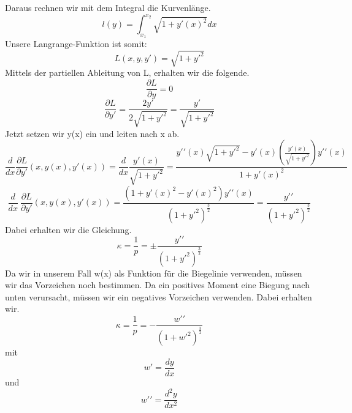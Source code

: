 Daraus rechnen wir mit dem Integral die Kurvenlänge.
\begin{equation}
	l(y)=
	\int_{x_1}^{x_2}\sqrt{1+{y\prime(x)}^2}dx
\end{equation}
Unsere Langrange-Funktion ist somit:
\begin{equation}
	L(x,y,y\prime)=
	\sqrt{1+{y\prime}^2}
\end{equation}
Mittels der partiellen Ableitung von L, erhalten wir die folgende.
\begin{equation}
	\frac{\partial L}{\partial y}=
	0
\end{equation}
\begin{equation}
	\frac{\partial L}{\partial y\prime}=
	\frac{2y\prime}{2\sqrt{1+{y\prime}^2}}=
	\frac{y\prime}{\sqrt{1+{y\prime}^2}}
\end{equation}
Jetzt setzen wir y(x) ein und leiten nach x ab.
\begin{equation}
	\frac{d}{dx}\frac{\partial L}{\partial y\prime}(x,y(x),y\prime(x))=
	\frac{d}{dx}\frac{y\prime(x)}{\sqrt{1+{y\prime}^2}}=
	\frac{y\prime\prime(x)\sqrt{1+{y\prime}^2}-y\prime(x)\left(\frac{y\prime(x)}{\sqrt{1+{y\prime}^2}}\right)y\prime\prime(x)}{1+{y\prime(x)}^2}
\end{equation}
\begin{equation}
	\frac{d}{dx}\ \frac{\partial L}{\partial y\prime}(x,y(x),y\prime(x))=
	\frac{(1+{y\prime(x)}^2-{y\prime(x)}^2)y\prime\prime(x)}{\left(1+{y\prime}^2\right)^\frac{3}{2}}=
	\frac{y\prime\prime}{\left(1+{y\prime}^2\right)^\frac{3}{2}}
\end{equation}
Dabei erhalten wir die Gleichung.
\begin{equation}
	\kappa=
	\frac{1}{p}=
	\pm\frac{y\prime\prime}{\left(1+{y\prime}^2\right)^\frac{3}{2}}
\end{equation}
Da wir in unserem Fall w(x) als Funktion für die Biegelinie verwenden, müssen wir das Vorzeichen noch bestimmen.
Da ein positives Moment eine Biegung nach unten verursacht, müssen wir ein negatives Vorzeichen verwenden. Dabei erhalten wir.
\begin{equation}
	\kappa=
	\frac{1}{p}=
	-\frac{w\prime\prime}{\left(1+{w\prime}^2\right)^\frac{3}{2}}
\end{equation}
mit
\begin{equation}
	w\prime=
	\frac{dy}{dx} 
\end{equation}
und
\begin{equation}
	w\prime\prime=
	\frac{d^2y}{dx^2}
\end{equation}

